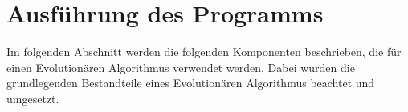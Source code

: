 
\section{Ausführung des Programms}
\label{ch:Entwurf:sec:Ausführung des Programms}

Im folgenden Abschnitt werden die folgenden Komponenten beschrieben, die für einen Evolutionären Algorithmus verwendet werden. Dabei wurden die grundlegenden Bestandteile eines Evolutionären Algorithmus beachtet und umgesetzt. 


